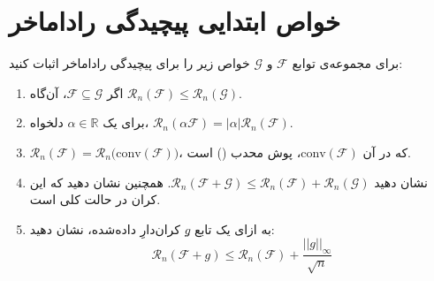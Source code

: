 \section
[خواص ابتدایی پیچیدگی راداماخر]
{خواص ابتدایی پیچیدگی راداماخر}
برای مجموعه‌ی توابع 
$\mathcal{F}$
و
$\mathcal{G}$
خواص زیر را برای پیچیدگی راداماخر اثبات کنید:
\begin{enumerate}
\item 
اگر
$\mathcal{F} \subseteq \mathcal{G}$،
آن‌گاه
$\mathcal{R}_n(\mathcal{F}) \leq \mathcal{R}_n(\mathcal{G})$.


\item
برای یک 
$\alpha \in \mathbb{R}$
 دلخواه، 
$\mathcal{R}_n(\alpha\mathcal{F}) = |\alpha| \mathcal{R}_n(\mathcal{F})$.

\item 
$\mathcal{R}_n(\mathcal{F}) = \mathcal{R}_n\Big(\mathrm{conv}(\mathcal{F})\Big)$،
که در آن 
$\mathrm{conv}(\mathcal{F})$،
پوش محدب
 ()
است.
\item
نشان دهید 
$\mathcal{R}_n(\mathcal{F}+\mathcal{G}) \leq \mathcal{R}_n(\mathcal{F}) + \mathcal{R}_n(\mathcal{G})$.
همچنین نشان دهید که این کران در حالت کلی
است.

\item 
به ازای یک تابع
$g$ِ
کران‌دارِ داده‌شده، نشان دهید:
$$\mathcal{R}_n(\mathcal{F}+g) \leq \mathcal{R}_n(\mathcal{F}) + \frac{||g||_\infty}{\sqrt{n}}$$


\end{enumerate}
